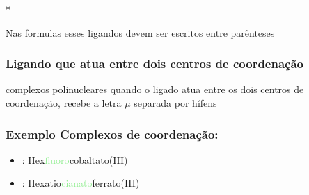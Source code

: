 \documentclass[12pt]{report}
\begin{document}
\hypertarget{o2n2}{*} Nas formulas esses ligandos devem ser escritos entre parênteses

\hypertarget{regras11}{}%
\subsubsection{Ligando que atua entre dois centros de coordenação}

\hyperlink{compolinucleares}{complexos polinucleares} quando o ligado atua entre os dois centros de coordenação, recebe a letra $\mu$ separada por hífens

\subsubsection{Exemplo Complexos de coordenação:}

\begin{multicols}{2}

	\begin{itemize}
	\item {}:
		Hex\textcolor{LightGreen}{fluoro}cobaltato(III)
	\item {}:
		Hexatio\textcolor{LightGreen}{cianato}ferrato(III)
	\end{itemize}
	
\end{multicols}
\end{document}
